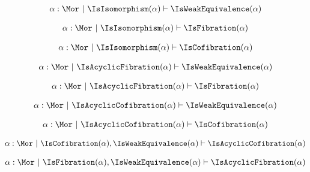 \begin{sequent}
\begin{align*}
\alpha:\Mor ~|~ \IsIsomorphism( \alpha ) \vdash \IsWeakEquivalence( \alpha )
\end{align*}
\end{sequent}

\begin{sequent}
\begin{align*}
\alpha:\Mor ~|~ \IsIsomorphism( \alpha ) \vdash \IsFibration( \alpha )
\end{align*}
\end{sequent}
\begin{sequent}

\begin{align*}
\alpha:\Mor ~|~ \IsIsomorphism( \alpha ) \vdash \IsCofibration( \alpha )
\end{align*}
\end{sequent}

\begin{sequent}
\begin{align*}
\alpha:\Mor ~|~ \IsAcyclicFibration( \alpha ) \vdash \IsWeakEquivalence( \alpha )
\end{align*}
\end{sequent}

\begin{sequent}
\begin{align*}
\alpha:\Mor ~|~ \IsAcyclicFibration( \alpha ) \vdash \IsFibration( \alpha )
\end{align*}
\end{sequent}

\begin{sequent}
\begin{align*}
\alpha:\Mor ~|~ \IsAcyclicCofibration( \alpha ) \vdash \IsWeakEquivalence( \alpha )
\end{align*}
\end{sequent}

\begin{sequent}
\begin{align*}
\alpha:\Mor ~|~ \IsAcyclicCofibration( \alpha ) \vdash \IsCofibration( \alpha )
\end{align*}
\end{sequent}

\begin{sequent}
\begin{align*}
\alpha:\Mor ~|~ \IsCofibration( \alpha ), \IsWeakEquivalence( \alpha ) \vdash \IsAcyclicCofibration( \alpha )
\end{align*}
\end{sequent}

\begin{sequent}
\begin{align*}
\alpha:\Mor ~|~ \IsFibration( \alpha ), \IsWeakEquivalence( \alpha ) \vdash \IsAcyclicFibration( \alpha )
\end{align*}
\end{sequent}




